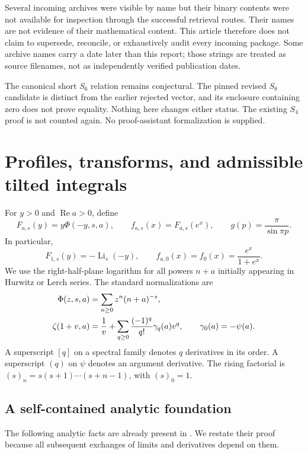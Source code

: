\documentclass[11pt,letterpaper]{article}
\numberwithin{equation}{section}
\theoremstyle{definition}\newtheorem{definition}[theorem]{Definition}
\theoremstyle{remark}\newtheorem{remark}[theorem]{Remark}
\newcommand{\Li}{\operatorname{Li}}\newcommand{\Rea}{\operatorname{Re}}\newcommand{\Ima}{\operatorname{Im}}
\begin{document}
Several incoming archives were visible by name but their binary contents were not available for inspection through the successful retrieval routes. Their names are not evidence of their mathematical content. This article therefore does not claim to supersede, reconcile, or exhaustively audit every incoming package. Some archive names carry a date later than this report; those strings are treated as source filenames, not as independently verified publication dates.

The canonical short $S_6$ relation remains conjectural. The pinned revised $S_8$ candidate is distinct from the earlier rejected vector, and its enclosure containing zero does not prove equality. Nothing here changes either status. The existing $S_4$ proof is not counted again. No proof-assistant formalization is supplied.

\section{Profiles, transforms, and admissible tilted integrals}
\label{tlbc:sec:transform}
For $y>0$ and $\Rea a>0$, define
\begin{equation}\label{tlbc:eq:profile}
 F_{a,s}(y)=y\Phi(-y,s,a),\qquad f_{a,s}(x)=F_{a,s}(e^x),\qquad
 g(p)=\frac{\pi}{\sin\pi p}.
\end{equation}
In particular,
\[
 F_{1,s}(y)=-\Li_s(-y),\qquad f_{a,0}(x)=f_0(x)=\frac{e^x}{1+e^x}.
\]
We use the right-half-plane logarithm for all powers $n+a$ initially appearing in Hurwitz or Lerch series. The standard normalizations are \cite{DLMF}
\begin{align}
 \Phi(z,s,a)&=\sum_{n\ge0}z^n(n+a)^{-s},\notag\\
 \zeta(1+v,a)&=\frac1v+\sum_{q\ge0}\frac{(-1)^q}{q!}\gamma_q(a)v^q,
 \qquad \gamma_0(a)=-\psi(a).\label{tlbc:eq:stieltjes}
\end{align}
A superscript $[q]$ on a spectral family denotes $q$ derivatives in its order. A superscript $(q)$ on $\psi$ denotes an argument derivative. The rising factorial is $(s)_n=s(s+1)\cdots(s+n-1)$, with $(s)_0=1$.

\subsection{A self-contained analytic foundation}
The following analytic facts are already present in \cite{RLC}. We restate their proof because all subsequent exchanges of limits and derivatives depend on them.
\end{document}
